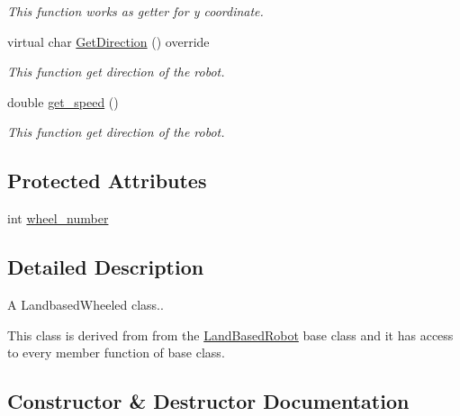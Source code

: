 \begin{DoxyCompactItemize}
\begin{DoxyCompactList}\small\item\em This function works as getter for y coordinate. \end{DoxyCompactList}\item 
virtual char \hyperlink{classfp_1_1_land_based_wheeled_a87c986392b37f25dd63e03866c2ab9c2}{Get\+Direction} () override
\begin{DoxyCompactList}\small\item\em This function get direction of the robot. \end{DoxyCompactList}\item 
double \hyperlink{classfp_1_1_land_based_wheeled_ab687789dad29fe8178ed1e60bd79500f}{get\+\_\+speed} ()
\begin{DoxyCompactList}\small\item\em This function get direction of the robot. \end{DoxyCompactList}\end{DoxyCompactItemize}
\subsection*{Protected Attributes}
\begin{DoxyCompactItemize}
\item 
int \hyperlink{classfp_1_1_land_based_wheeled_ac50206eb412222a4d3c8f494c5dbd09b}{wheel\+\_\+number}
\end{DoxyCompactItemize}


\subsection{Detailed Description}
A Landbased\+Wheeled class.. 

This class is derived from from the \hyperlink{classfp_1_1_land_based_robot}{Land\+Based\+Robot} base class and it has access to every member function of base class. 

\subsection{Constructor \& Destructor Documentation}
\mbox{\label{classfp_1_1_land_based_wheeled_ad2b73f9998381dafa6b4a0388acfc28c}} 
